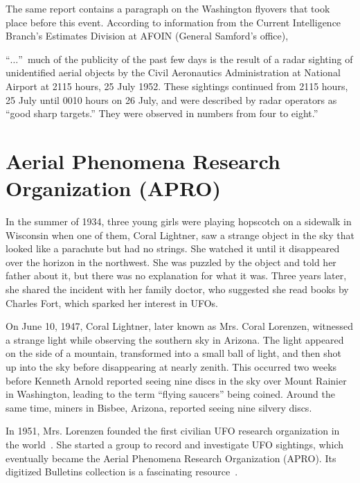 The same report contains a paragraph on the Washington flyovers that took place before this event.
According to information from the Current Intelligence Branch's Estimates Division at AFOIN
(General Samford's office),
\begin{svgraybox}
``$\ldots$''~much of the publicity of the past few days is the result of a radar sighting of unidentified aerial objects by the
Civil Aeronautics Administration at National Airport at 2115 hours, 25 July 1952.
These sightings continued from 2115 hours, 25 July until 0010 hours on 26 July, and were described by radar operators as ``good sharp targets.''
They were observed in numbers from four to eight.''
\end{svgraybox}


\section{Aerial Phenomena Research Organization (APRO)}
\label{2023-UFO-part-History-chapter-post-1945-pre-1953-APRO}

In the summer of 1934, three young girls were playing hopscotch on a sidewalk in Wisconsin when one of them, Coral Lightner, saw a strange object in the sky that looked like a parachute but had no strings. She watched it until it disappeared over the horizon in the northwest. She was puzzled by the object and told her father about it, but there was no explanation for what it was. Three years later, she shared the incident with her family doctor, who suggested she read books by Charles Fort, which sparked her interest in UFOs.

On June 10, 1947, Coral Lightner, later known as Mrs. Coral Lorenzen, witnessed a strange light while observing the southern sky in Arizona. The light appeared on the side of a mountain, transformed into a small ball of light, and then shot up into the sky before disappearing at nearly zenith. This occurred two weeks before Kenneth Arnold reported seeing nine discs in the sky over Mount Rainier in Washington, leading to the term ``flying saucers'' being coined. Around the same time, miners in Bisbee, Arizona, reported seeing nine silvery discs.

In 1951, Mrs. Lorenzen founded the first civilian UFO research organization in the world~\cite{Lorenzen1966Jan}. She started a group to record and investigate UFO sightings, which eventually became the Aerial Phenomena Research Organization (APRO). Its digitized Bulletins collection is a fascinating resource~\cite{APROBulletins}.

